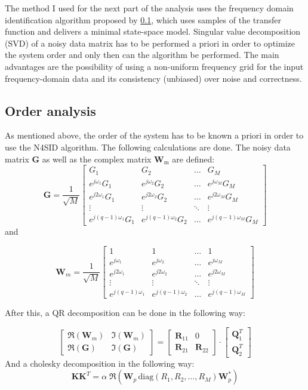 The method I used for the next part of the analysis uses the frequency domain identification algorithm proposed by \ref{}, which uses samples of the transfer function and delivers a minimal state-space model. Singular value decomposition (SVD) of a noisy data matrix has to be performed a priori in order to optimize the system order and only then can the algorithm be performed. The main advantages are the possibility of using a non-uniform frequency grid for the input frequency-domain data and its consistency (unbiased) over noise and correctness. 


\subsection{Order analysis}

As mentioned above, the order of the system has to be known a priori in order to use the N4SID algorithm. The following calculations are done. The noisy data matrix $\textbf{G}$ as well as the complex matrix $\textbf{W}_\text{m}$ are defined:
\[
\textbf{G} = \frac{1}{\sqrt{M}}
\begin{bmatrix}
G_1 & G_2 & \dots & G_M \\
e^{j\omega_1}G_1 & e^{j\omega_2}G_2 & \dots & e^{j\omega_M}G_M \\
e^{j2\omega_1}G_1 & e^{j2\omega_2}G_2 & \dots & e^{j2\omega_M}G_M \\
\vdots & \vdots & \ddots & \vdots \\
e^{j(q-1)\omega_1}G_1 &e^{j(q-1)\omega_2} G_2 & \dots & e^{j(q-1)\omega_M}G_M 
\end{bmatrix} \]
and

\[
\textbf{W}_m = \frac{1}{\sqrt{M}}
\begin{bmatrix}
1 & 1 & \dots & 1 \\
e^{j\omega_1} & e^{j\omega_2} & \dots & e^{j\omega_M} \\
e^{j2\omega_1} & e^{j2\omega_2} & \dots & e^{j2\omega_M} \\
\vdots & \vdots & \ddots & \vdots \\
e^{j(q-1)\omega_1} &e^{j(q-1)\omega_2} & \dots & e^{j(q-1)\omega_M} 
\end{bmatrix}\]

After this, a QR decomposition can be done in the following way:

\[\begin{bmatrix}
\Re(\textbf{W}_m) & \Im(\textbf{W}_m) \\
\Re(\textbf{G}) & \Im(\textbf{G})
\end{bmatrix} = 
\begin{bmatrix}
\textbf{R}_{11} & 0 \\
\textbf{R}_{21} & \textbf{R}_{22}
\end{bmatrix}\cdot
\begin{bmatrix}
\textbf{Q}_1^T \\
\textbf{Q}_2^T
\end{bmatrix}
\]
And a cholesky decomposition in the following way:
\[\textbf{K}\textbf{K}^T = \alpha\;\Re(\textbf{W}_p\,\text{diag}(R_1,R_2,\dots, R_M)\textbf{W}_p^*)\]

